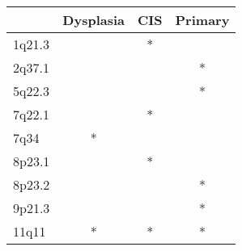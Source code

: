\begin{tabular}{lccc}
\toprule
{} & Dysplasia & CIS & Primary \\
\midrule
1q21.3 &           &   * &         \\
2q37.1 &           &     &       * \\
5q22.3 &           &     &       * \\
7q22.1 &           &   * &         \\
7q34   &         * &     &         \\
8p23.1 &           &   * &         \\
8p23.2 &           &     &       * \\
9p21.3 &           &     &       * \\
11q11  &         * &   * &       * \\
\bottomrule
\end{tabular}
